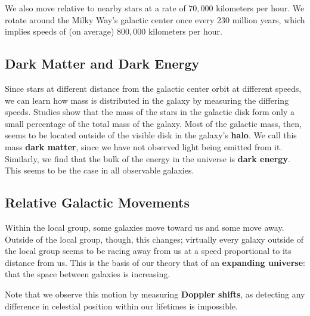 We also move relative to nearby stars at a rate of $70,000$ kilometers per hour. We rotate around the Milky Way's galactic center once every 230 million years, which implies speeds of (on average) $800,000$ kilometers per hour.

\subsection{Dark Matter and Dark Energy}
Since stars at different distance from the galactic center orbit at different speeds, we can learn how mass is distributed in the galaxy by measuring the differing speeds. Studies show that the mass of the stars in the galactic disk form only a small percentage of the total mass of the galaxy. Most of the galactic mass, then, seems to be located outside of the visible disk in the galaxy's {\bf halo}. We call this mass {\bf dark matter}, since we have not observed light being emitted from it. Similarly, we find that the bulk of the energy in the universe is {\bf dark energy}. This seems to be the case in all observable galaxies.

\subsection{Relative Galactic Movements}
Within the local group, some galaxies move toward us and some move away. Outside of the local group, though, this changes; virtually every galaxy outside of the local group seems to be racing away from us at a speed proportional to its distance from us. This is the basis of our theory that of an {\bf expanding universe}: that the space between galaxies is increasing.

Note that we observe this motion by measuring {\bf Doppler shifts}, as detecting any difference in celestial position within our lifetimes is impossible.
